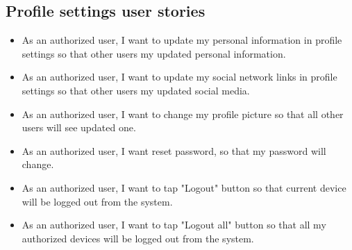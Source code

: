 \subsection{Profile settings user stories}\label{subsec:profile-settings-user-stories}
\begin{itemize}
    \item As an authorized user, I want to update my personal information in profile settings so that other users my updated personal information.
    \item As an authorized user, I want to update my social network links in profile settings so that other users my updated social media.
    \item As an authorized user, I want to change my profile picture so that all other users will see updated one.
    \item As an authorized user, I want reset password, so that my password will change.
    \item As an authorized user, I want to tap "Logout" button so that current device will be logged out from the system.
    \item As an authorized user, I want to tap "Logout all" button so that all my authorized devices will be logged out from the system.
\end{itemize}

